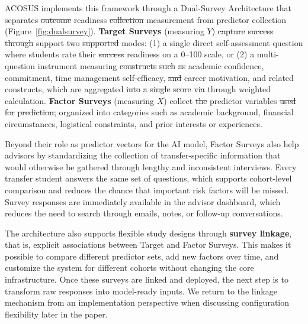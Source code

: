 \documentclass[letterpaper,11pt]{article}
\newcommand{\DIFdel}[1]{%
  \begingroup\setlength{\fboxsep}{0.5pt}%
  \colorbox{diffdelbg}{\textcolor{diffdeltext}{\sout{#1}}}%
  \endgroup}
\newcommand{\DIFadd}[1]{%
  \begingroup\setlength{\fboxsep}{0.5pt}%
  \colorbox{diffaddbg}{\textcolor{diffaddtext}{#1}}%
  \endgroup}
\begin{document}
ACOSUS implements this framework through a Dual-Survey Architecture that separates \DIFdel{outcome} \DIFadd{readiness} \DIFdel{collection} \DIFadd{measurement} from predictor collection (Figure~\ref{fig:dualsurvey}). \textbf{Target Surveys} (measuring $Y$) \DIFdel{capture} \DIFdel{success} \DIFdel{through} \DIFadd{support} two \DIFdel{supported} modes: (1) a single direct self-assessment question where students rate their \DIFdel{success} \DIFadd{readiness} on a 0--100 scale, or (2) a multi-question instrument measuring \DIFdel{constructs} \DIFdel{such} \DIFdel{as} academic confidence, commitment, time management self-efficacy, \DIFdel{and} career motivation, \DIFadd{and} \DIFadd{related} \DIFadd{constructs,} which are aggregated \DIFdel{into} \DIFdel{a} \DIFdel{single} \DIFdel{score} \DIFdel{via} \DIFadd{through} weighted calculation. \textbf{Factor Surveys} (measuring $X$) collect \DIFdel{the} predictor variables \DIFdel{used} \DIFdel{for} \DIFdel{prediction,} organized into categories such as academic background, financial circumstances, logistical constraints, and prior interests or experiences.

Beyond their role as predictor vectors for the AI model, Factor Surveys also help advisors by standardizing the collection of transfer-specific information that would otherwise be gathered through lengthy and inconsistent interviews. Every transfer student answers the same set of questions, which supports cohort-level comparison and reduces the chance that important risk factors will be missed. Survey responses are immediately available in the advisor dashboard, which reduces the need to search through emails, notes, or follow-up conversations.

The architecture also supports flexible study designs through \textbf{survey linkage}, that is, explicit associations between Target and Factor Surveys. This makes it possible to compare different predictor sets, add new factors over time, and customize the system for different cohorts without changing the core infrastructure. Once these surveys are linked and deployed, the next step is to transform raw responses into model-ready inputs. We return to the linkage mechanism from an implementation perspective when discussing configuration flexibility later in the paper.
\end{document}
